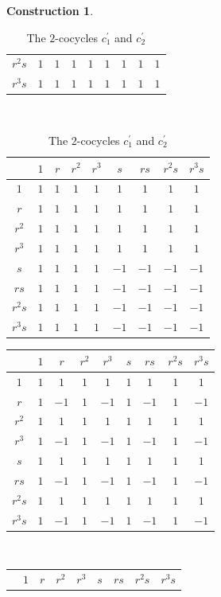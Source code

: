 \documentclass{article}
\theoremstyle{plain}
\theoremstyle{definition}
\newtheorem{const}[thm]{Construction}
\begin{document}
\begin{const}
\begin{table}[H]
\begin{tabular}{ c | c   c   c   c   c   c   c   c}
$r^2s$ & $1$ & $1$ & $1$ & $1$ & $1$ & $1$ & $1$ & $1$ \\
$r^3s$ & $1$ & $1$ & $1$ & $1$ & $1$ & $1$ & $1$ & $1$
\end{tabular} ~~~
\begin{tabular}{ c | c   c   c   c   c   c   c   c}
& $1$ & $r$ & $r^2$ & $r^3$ & $s$ & $rs$ & $r^2s$ & $r^3s$ \\
\hline
$1$ & $1$ & $1$ & $1$ & $1$ & $1$ & $1$ & $1$ & $1$ \\
$r$ & $1$ & $1$ & $1$ & $1$ & $1$ & $1$ & $1$ & $1$ \\
$r^2$ & $1$ & $1$ & $1$ & $1$ & $1$ & $1$ & $1$ & $1$ \\
$r^3$ & $1$ & $1$ & $1$ & $1$ & $1$ & $1$ & $1$ & $1$ \\
$s$ & $1$ & $1$ & $1$ & $1$ & $-1$ & $-1$ & $-1$ & $-1$ \\
$rs$ & $1$ & $1$ & $1$ & $1$ & $-1$ & $-1$ & $-1$ & $-1$ \\
$r^2s$ & $1$ & $1$ & $1$ & $1$ & $-1$ & $-1$ & $-1$ & $-1$ \\
$r^3s$ & $1$ & $1$ & $1$ & $1$ & $-1$ & $-1$ & $-1$ & $-1$
\end{tabular}
\caption{The $2$-cocycles $c^\prime_1$ and $c^\prime_2$}
\label{comingk4-1}
\end{table}
\begin{table}[H]
\centering
\begin{tabular}{ c | c   c   c   c   c   c   c   c}
& $1$ & $r$ & $r^2$ & $r^3$ & $s$ & $rs$ & $r^2s$ & $r^3s$ \\
\hline
$1$ & $1$ & $1$ & $1$ & $1$ & $1$ & $1$ & $1$ & $1$ \\
$r$ & $1$ & $-1$ & $1$ & $-1$ & $1$ & $-1$ & $1$ & $-1$ \\
$r^2$ & $1$ & $1$ & $1$ & $1$ & $1$ & $1$ & $1$ & $1$ \\
$r^3$ & $1$ & $-1$ & $1$ & $-1$ & $1$ & $-1$ & $1$ & $-1$ \\
$s$ & $1$ & $1$ & $1$ & $1$ & $1$ & $1$ & $1$ & $1$ \\
$rs$ & $1$ & $-1$ & $1$ & $-1$ & $1$ & $-1$ & $1$ & $-1$ \\
$r^2s$ & $1$ & $1$ & $1$ & $1$ & $1$ & $1$ & $1$ & $1$ \\
$r^3s$ & $1$ & $-1$ & $1$ & $-1$ & $1$ & $-1$ & $1$ & $-1$
\end{tabular} ~~~
\begin{tabular}{ c | c   c   c   c   c   c   c   c}
& $1$ & $r$ & $r^2$ & $r^3$ & $s$ & $rs$ & $r^2s$ & $r^3s$ \\

\end{tabular}
\end{table}
\end{const}
\end{document}
